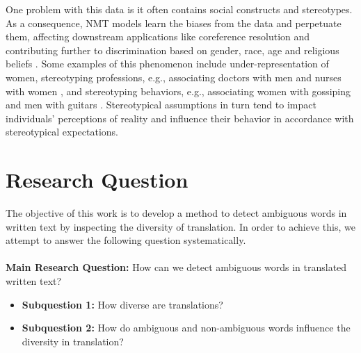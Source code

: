 One problem with this data is it often contains social constructs and stereotypes. As a consequence, NMT models learn the biases from the data and perpetuate them, affecting downstream applications like coreference resolution \parencite{Zhao_2018_coreference} and contributing further to discrimination based on gender, race, age and religious beliefs \parencite{Rudinger_2017}. Some examples of this phenomenon include under-representation of women, stereotyping professions, e.g., associating doctors with men and nurses with women \parencite{Escud_Font_2019}, and stereotyping behaviors, e.g., associating women with gossiping and men with guitars \parencite{Rudinger_2017}. Stereotypical assumptions in turn tend to impact individuals' perceptions of reality and influence their behavior in accordance with stereotypical expectations.

\section{Research Question}
\label{sec:Introduction:Questions}

The objective of this work is to develop a method to detect ambiguous words in written text by inspecting the diversity of translation. In order to achieve this, we attempt to answer the following question systematically.

\paragraph{} \textbf{Main Research Question:} How can we detect ambiguous words in translated written text?
\begin{itemize}
    \item \textbf{Subquestion 1:} How diverse are translations? %
    \item \textbf{Subquestion 2:} How do ambiguous and non-ambiguous words influence the diversity in translation? %
    
\end{itemize}




